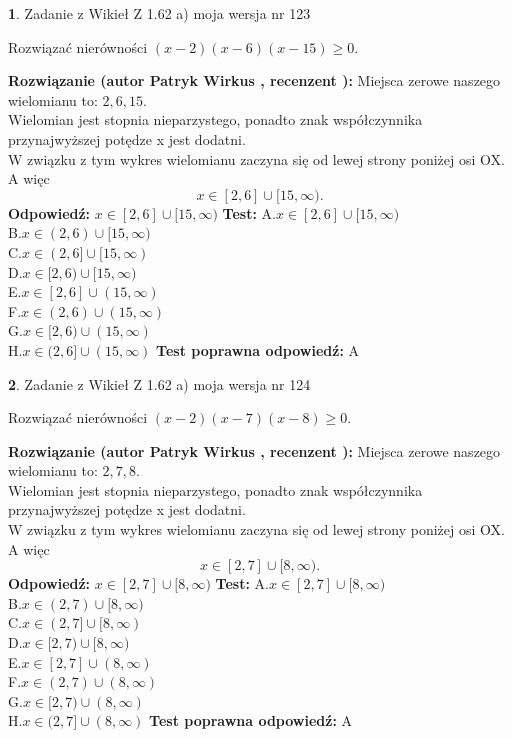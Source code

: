 \documentclass[12pt, a4paper]{article}
\theoremstyle{definition} %
\newtheorem{zad}{}
\newcommand{\zadStart}[1]{\begin{zad}#1\newline}
\newcommand{\zadStop}{\end{zad}}
\newcommand{\rozwStart}[2]{\noindent \textbf{Rozwiązanie (autor #1 , recenzent #2): }\newline}
\newcommand{\rozwStop}{\newline}
\newcommand{\odpStart}{\noindent \textbf{Odpowiedź:}\newline}
\newcommand{\odpStop}{\newline}
\newcommand{\testStart}{\noindent \textbf{Test:}\newline}
\newcommand{\testStop}{\newline}
\newcommand{\kluczStart}{\noindent \textbf{Test poprawna odpowiedź:}\newline}
\newcommand{\kluczStop}{\newline}
\begin{document}
\zadStart{Zadanie z Wikieł Z 1.62 a) moja wersja nr 123}

Rozwiązać nierówności $(x-2)(x-6)(x-15)\ge0$.
\zadStop
\rozwStart{Patryk Wirkus}{}
Miejsca zerowe naszego wielomianu to: $2, 6, 15$.\\
Wielomian jest stopnia nieparzystego, ponadto znak współczynnika przy\linebreak najwyższej potędze x jest dodatni.\\ W związku z tym wykres wielomianu zaczyna się od lewej strony poniżej osi OX. A więc $$x \in [2,6] \cup [15,\infty).$$
\rozwStop
\odpStart
$x \in [2,6] \cup [15,\infty)$
\odpStop
\testStart
A.$x \in [2,6] \cup [15,\infty)$\\
B.$x \in (2,6) \cup [15,\infty)$\\
C.$x \in (2,6] \cup [15,\infty)$\\
D.$x \in [2,6) \cup [15,\infty)$\\
E.$x \in [2,6] \cup (15,\infty)$\\
F.$x \in (2,6) \cup (15,\infty)$\\
G.$x \in [2,6) \cup (15,\infty)$\\
H.$x \in (2,6] \cup (15,\infty)$
\testStop
\kluczStart
A
\kluczStop



\zadStart{Zadanie z Wikieł Z 1.62 a) moja wersja nr 124}

Rozwiązać nierówności $(x-2)(x-7)(x-8)\ge0$.
\zadStop
\rozwStart{Patryk Wirkus}{}
Miejsca zerowe naszego wielomianu to: $2, 7, 8$.\\
Wielomian jest stopnia nieparzystego, ponadto znak współczynnika przy\linebreak najwyższej potędze x jest dodatni.\\ W związku z tym wykres wielomianu zaczyna się od lewej strony poniżej osi OX. A więc $$x \in [2,7] \cup [8,\infty).$$
\rozwStop
\odpStart
$x \in [2,7] \cup [8,\infty)$
\odpStop
\testStart
A.$x \in [2,7] \cup [8,\infty)$\\
B.$x \in (2,7) \cup [8,\infty)$\\
C.$x \in (2,7] \cup [8,\infty)$\\
D.$x \in [2,7) \cup [8,\infty)$\\
E.$x \in [2,7] \cup (8,\infty)$\\
F.$x \in (2,7) \cup (8,\infty)$\\
G.$x \in [2,7) \cup (8,\infty)$\\
H.$x \in (2,7] \cup (8,\infty)$
\testStop
\kluczStart
A
\kluczStop
\end{document}
